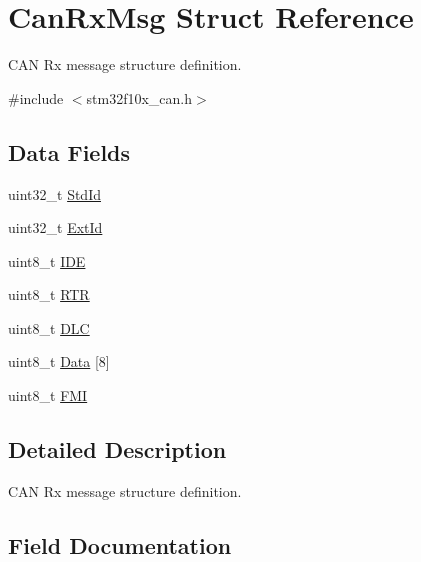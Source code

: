 \hypertarget{struct_can_rx_msg}{}\section{Can\+Rx\+Msg Struct Reference}
\label{struct_can_rx_msg}


C\+AN Rx message structure definition.  




{\ttfamily \#include $<$stm32f10x\+\_\+can.\+h$>$}

\subsection*{Data Fields}
\begin{DoxyCompactItemize}
\item 
uint32\+\_\+t \mbox{\hyperlink{struct_can_rx_msg_a511131786af8d1534273e48ea2052245}{Std\+Id}}
\item 
uint32\+\_\+t \mbox{\hyperlink{struct_can_rx_msg_a8625d2aaf6b0b99f0faf0b8cd07debd4}{Ext\+Id}}
\item 
uint8\+\_\+t \mbox{\hyperlink{struct_can_rx_msg_accecf260a60cf687f0f9898421aeea86}{I\+DE}}
\item 
uint8\+\_\+t \mbox{\hyperlink{struct_can_rx_msg_a131e825d532b66f27dbb74aa80864d37}{R\+TR}}
\item 
uint8\+\_\+t \mbox{\hyperlink{struct_can_rx_msg_a5f86974a53a85fb5706e08f8106296b9}{D\+LC}}
\item 
uint8\+\_\+t \mbox{\hyperlink{struct_can_rx_msg_ab7783127a49388ba2431603e29251b9b}{Data}} \mbox{[}8\mbox{]}
\item 
uint8\+\_\+t \mbox{\hyperlink{struct_can_rx_msg_af219946419093720aad14ef427f3cde4}{F\+MI}}
\end{DoxyCompactItemize}


\subsection{Detailed Description}
C\+AN Rx message structure definition. 



\subsection{Field Documentation}
\mbox{\label{struct_can_rx_msg_ab7783127a49388ba2431603e29251b9b}} 
